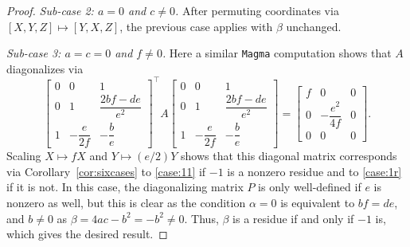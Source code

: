 \documentclass[10pt,a4paper]{amsart}
\numberwithin{equation}{section}
\numberwithin{figure}{section}
\numberwithin{table}{section}
\theoremstyle{definition}
\theoremstyle{plain}
\theoremstyle{remark}
\theoremstyle{plain}
\theoremstyle{definition}
\theoremstyle{plain}
\theoremstyle{plain}
\begin{document}
\begin{proof}
        \emph{Sub-case 2: $a=0$ and $c\ne 0$.} After permuting coordinates via $[X,Y,Z]\mapsto[Y,X,Z]$, the previous case applies with $\beta$ unchanged.

		\emph{Sub-case 3: $a=c=0$ and $f\ne 0$.} Here a similar \texttt{Magma} computation shows that $A$ diagonalizes via
		\begin{equation*}
		\begin{bmatrix}
		0 & 0 & 1\\
		0 & 1 & \dfrac{2bf - de}{e^2}\\
		1 & -\dfrac{e}{2f} & -\dfrac{b}{e}
		\end{bmatrix}^\top\!
		A
		\begin{bmatrix}
		0 & 0 & 1\\
		0 & 1 & \dfrac{2bf - de}{e^2}\\
		1 & -\dfrac{e}{2f} & -\dfrac{b}{e}
		\end{bmatrix}
		=
		\begin{bmatrix}
		f&0&0\\
		0&-\dfrac{e^2}{4f}&0\\
		0&0&0
		\end{bmatrix}.
		\end{equation*}
		Scaling $X\mapsto fX$ and $Y\mapsto(e/2)Y$ shows that this diagonal matrix corresponds via Corollary~\ref{cor:sixcases} to \eqref{case:11} if $-1$ is a nonzero residue and to \eqref{case:1r} if it is not. In this case, the diagonalizing matrix $P$ is only well-defined if $e$ is nonzero as well, but this is clear as the condition $\alpha=0$ is equivalent to $bf=de$, and $b\ne 0$ as $\beta=4ac-b^2=-b^2\ne 0$. Thus, $\beta$ is a residue if and only if $-1$ is, which gives the desired result.


\end{proof}
\end{document}
